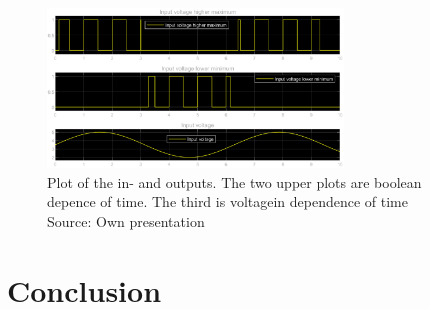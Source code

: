 		\begin{figure}[H]
			\centering
			\includegraphics[width=0.7\textwidth]{figures/v_monitor_graph.eps}
			\caption[Plot of the in- and outputs]{Plot of the in- and outputs. The two upper plots are boolean depence of time. The third is voltagein dependence of time\\ Source: Own presentation}
			\label{fig:v_graph}
		\end{figure}
	
	
	
\section{Conclusion}
